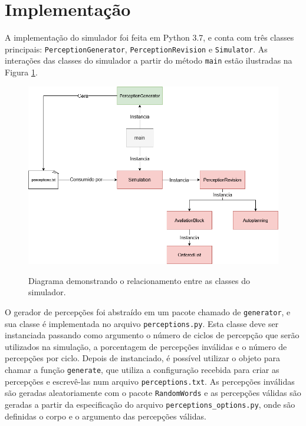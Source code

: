 \section{Implementação}

A implementação do simulador foi feita em Python 3.7, e conta com três classes principais: \texttt{PerceptionGenerator}, \texttt{PerceptionRevision} e \texttt{Simulator}. As interações das classes do simulador a partir do método \texttt{main} estão ilustradas na Figura \ref{fig:diagrama-implementacao}.

\begin{figure}
    \centering
    \caption{Diagrama demonstrando o relacionamento entre as classes do simulador.}
    \includegraphics[width=\textwidth]{images/diagrama-implementacao.png}
    \label{fig:diagrama-implementacao}
\end{figure}

O gerador de percepções foi abstraído em um pacote chamado de \texttt{generator}, e sua classe é implementada no arquivo \texttt{perceptions.py}. Esta classe deve ser instanciada passando como argumento o número de ciclos de percepção que serão utilizados na simulação, a porcentagem de percepções inválidas e o número de percepções por ciclo. Depois de instanciado, é possível utilizar o objeto para chamar a função \texttt{generate}, que utiliza a configuração recebida para criar as percepções e escrevê-las num arquivo \texttt{perceptions.txt}. As percepções inválidas são geradas aleatoriamente com o pacote \texttt{RandomWords} e as percepções válidas são geradas a partir da especificação do arquivo \texttt{perceptions\_options.py}, onde são definidas o corpo e o argumento das percepções válidas.

